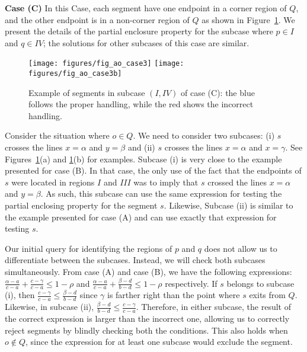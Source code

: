 {\bf Case (C)}
In this Case, each segment have one endpoint in a corner region of $Q$, 
and the other endpoint is in a non-corner region of $Q$ as shown in Figure~\ref{fig:rectangles:ao:case3}. We present the details of the partial 
enclosure property for the subcase where $p \in I$ and $q \in IV$; the 
solutions for other subcases of this case are similar.

\begin{figure}[t]
\begin{center}
  \texttt{[image: figures/fig\_ao\_case3]}
  \hspace{1.0em}
  \texttt{[image: figures/fig\_ao\_case3b]}
  \caption{Example of segments in  subcase $(I, IV)$ of case 
  (C): the blue follows the proper handling, while the red shows the 
  incorrect handling.}
  \label{fig:rectangles:ao:case3}
\end{center}
\end{figure}

Consider the situation where $o \in Q$. We need to consider two 
subcases: (i) $s$ crosses the lines $x=\alpha$ and $y=\beta$ and 
(ii) $s$ crosses the lines $x=\alpha$ and $x=\gamma$. See 
Figures~\ref{fig:rectangles:ao:case3}(a) and 
\ref{fig:rectangles:ao:case3}(b) for examples. Subcase (i) is very 
close to the example presented for case (B). In that case, 
the only use of the fact that the endpoints of $s$ were located in 
regions $I$ and $III$ was to imply that $s$ crossed the lines 
$x=\alpha$ and $y=\beta$. As such, this subcase can use the same 
expression for testing the partial enclosing property for the segment 
$s$. Likewise, Subcase (ii) is similar to the 
example presented for case (A) and can use exactly that expression 
for testing $s$.

Our initial query for identifying the regions of $p$ and $q$ does 
not allow us to differentiate between the subcases. Instead, we will 
check both subcases simultaneously. From case (A) and case (B), 
we have the following expressions:
$ \frac{\alpha - a}{c - a} + \frac{c - \gamma}{c - a} \leq 1 - \rho$
 and
$\frac{\alpha - a}{c - a} + \frac{\beta - d}{b - d} \leq 1 - \rho$
respectively. If $s$ belongs to subcase (i), then 
$\frac{c - \gamma}{c - a} \leq \frac{\beta - d}{b - d}$ since 
$\gamma$ is farther right than the point where $s$ exits from $Q$. 
Likewise, in subcase (ii), 
$\frac{\beta - d}{b - d} \leq \frac{c - \gamma}{c - a}$.
Therefore, in either subcase, the result of the correct expression 
is larger than the incorrect one, allowing us to correctly reject 
segments by blindly checking both the conditions. This also holds when 
$o \not \in Q$, since the expression for at least one subcase would 
exclude the segment.


